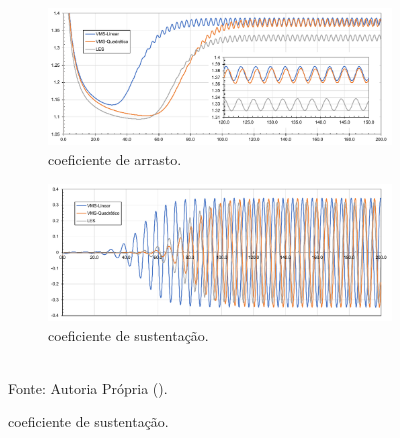 \begin{figure}[h!]
    \centering
    \caption{Valores ao longo do tempo de:}
    \begin{subfigure}{\textwidth}
        \includegraphics[width=\linewidth]{Figuras/cylinder/drag.pdf}
        \caption{coeficiente de arrasto.}
    \end{subfigure}
    \begin{subfigure}{\textwidth}
        \includegraphics[width=\linewidth]{Figuras/cylinder/lift.pdf}
        \caption{coeficiente de sustentação.}
    \end{subfigure}
    \\Fonte: Autoria Própria (\the\year).
    \label{fig:cyl-draglift}
\end{figure}

